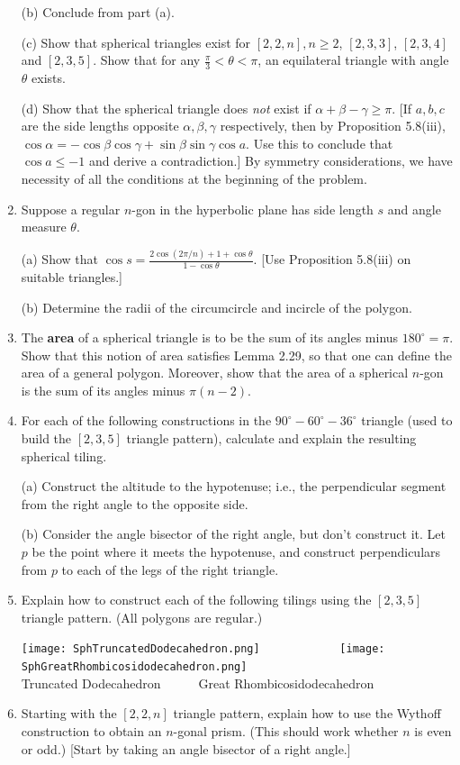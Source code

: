 \documentclass[leqno]{book}
\begin{document}
\begin{enumerate}
(b) Conclude from part (a).

(c) Show that spherical triangles exist for $[2,2,n],n\geqslant 2$, $[2,3,3]$, $[2,3,4]$ and $[2,3,5]$.  Show that for any $\frac{\pi}3<\theta<\pi$, an equilateral triangle with angle $\theta$ exists.

(d) Show that the spherical triangle does \emph{not} exist if $\alpha+\beta-\gamma\geqslant\pi$.  [If $a,b,c$ are the side lengths opposite $\alpha,\beta,\gamma$ respectively, then by Proposition 5.8(iii), $\cos\alpha=-\cos\beta\cos\gamma+\sin\beta\sin\gamma\cos a$.  Use this to conclude that $\cos a\leqslant -1$ and derive a contradiction.]  By symmetry considerations, we have necessity of all the conditions at the beginning of the problem.

\item Suppose a regular $n$-gon in the hyperbolic plane has side length $s$ and angle measure $\theta$.

(a) Show that $\cos s=\frac{2\cos(2\pi/n)+1+\cos\theta}{1-\cos\theta}$.  [Use Proposition 5.8(iii) on suitable triangles.]

(b) Determine the radii of the circumcircle and incircle of the polygon.

\item The \textbf{area} of a spherical triangle is to be the sum of its angles minus $180^\circ=\pi$.  Show that this notion of area satisfies Lemma 2.29, so that one can define the area of a general polygon.  Moreover, show that the area of a spherical $n$-gon is the sum of its angles minus $\pi(n-2)$. %

\item For each of the following constructions in the $90^\circ-60^\circ-36^\circ$ triangle (used to build the $[2,3,5]$ triangle pattern), calculate and explain the resulting spherical tiling.

(a) Construct the altitude to the hypotenuse; i.e., the perpendicular segment from the right angle to the opposite side.

(b) Consider the angle bisector of the right angle, but don't construct it.  Let $p$ be the point where it meets the hypotenuse, and construct perpendiculars from $p$ to each of the legs of the right triangle.

\item Explain how to construct each of the following tilings using the $[2,3,5]$ triangle pattern.  (All polygons are regular.)
\begin{center}
\texttt{[image: SphTruncatedDodecahedron.png]}~~~~~~~~~~~~
\texttt{[image: SphGreatRhombicosidodecahedron.png]}~~~~\\
Truncated Dodecahedron~~~~~~Great Rhombicosidodecahedron
\end{center}
\item Starting with the $[2,2,n]$ triangle pattern, explain how to use the Wythoff construction to obtain an $n$-gonal prism.  (This should work whether $n$ is even or odd.)  [Start by taking an angle bisector of a right angle.]
\end{enumerate}
\end{document}
